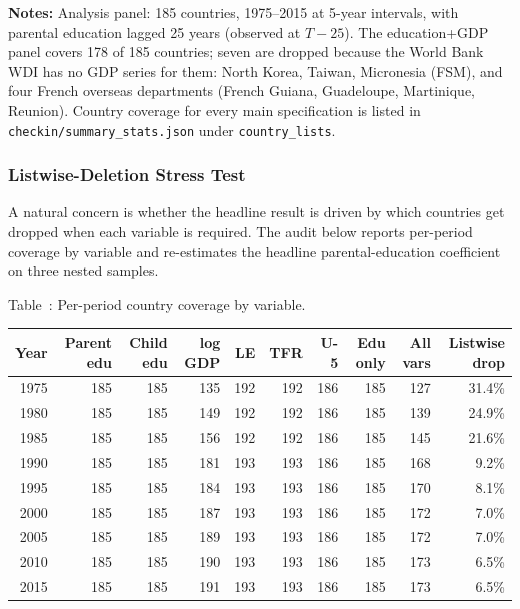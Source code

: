 \documentclass[12pt,letterpaper]{article}
\begin{document}
{\begin{minipage}{\dimexpr\textwidth-2em}
\scriptsize
\textbf{Notes:} Analysis panel: 185 countries, 1975--2015 at 5-year
intervals, with parental education lagged 25 years (observed at
$T{-}25$). The education+GDP panel covers 178 of 185 countries; seven
are dropped because the World Bank WDI has no GDP series for them:
North Korea, Taiwan, Micronesia (FSM), and four French overseas
departments (French Guiana, Guadeloupe, Martinique, Reunion). Country
coverage for every main specification is listed in
\texttt{checkin/summary\_stats.json} under \texttt{country\_lists}.
\end{minipage}

\subsubsection{Listwise-Deletion Stress Test}\label{appendix-listwise-deletion}

A natural concern is whether the headline result is driven by which
countries get dropped when each variable is required. The audit below
reports per-period coverage by variable and re-estimates the headline
parental-education coefficient on three nested samples.

\label{tab:missing-by-period}Table~\thetable: Per-period country coverage by variable.

\begin{center}
\footnotesize
\setlength{\tabcolsep}{3pt}
\begin{tabular}{@{}rrrrrrrrrr@{}}
\toprule
Year & Parent edu & Child edu & log GDP & LE & TFR & U-5 & Edu only & All vars & Listwise drop \\
\midrule
1975 & 185 & 185 & 135 & 192 & 192 & 186 & 185 & 127 & 31.4\% \\
1980 & 185 & 185 & 149 & 192 & 192 & 186 & 185 & 139 & 24.9\% \\
1985 & 185 & 185 & 156 & 192 & 192 & 186 & 185 & 145 & 21.6\% \\
1990 & 185 & 185 & 181 & 193 & 193 & 186 & 185 & 168 & 9.2\% \\
1995 & 185 & 185 & 184 & 193 & 193 & 186 & 185 & 170 & 8.1\% \\
2000 & 185 & 185 & 187 & 193 & 193 & 186 & 185 & 172 & 7.0\% \\
2005 & 185 & 185 & 189 & 193 & 193 & 186 & 185 & 172 & 7.0\% \\
2010 & 185 & 185 & 190 & 193 & 193 & 186 & 185 & 173 & 6.5\% \\
2015 & 185 & 185 & 191 & 193 & 193 & 186 & 185 & 173 & 6.5\% \\
\bottomrule
\end{tabular}
\end{center}

}
\end{document}
